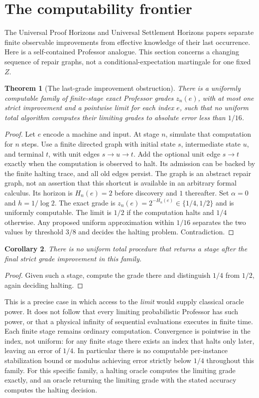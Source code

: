 \documentclass[11pt,letterpaper]{article}
\newtheorem{theorem}{Theorem}[section]
\newtheorem{corollary}[theorem]{Corollary}
\theoremstyle{definition}\newtheorem{definition}[theorem]{Definition}\newtheorem{example}[theorem]{Example}\newtheorem{conjecture}[theorem]{Conjecture}
\begin{document}
\section{The computability frontier}\label{sec:computability}
The Universal Proof Horizons and Universal Settlement Horizons papers \cite{uph,ush} separate finite observable improvements from effective knowledge of their last occurrence. Here is a self-contained Professor analogue. This section concerns a changing sequence of repair graphs, not a conditional-expectation martingale for one fixed $Z$.
\begin{theorem}[The last-grade improvement obstruction]\label{thm:halting}
There is a uniformly computable family of finite-stage exact Professor grades $z_n(e)$, with at most one strict improvement and a pointwise limit for each index $e$, such that no uniform total algorithm computes their limiting grades to absolute error less than $1/16$.
\end{theorem}
\begin{proof}
Let $e$ encode a machine and input. At stage $n$, simulate that computation for $n$ steps. Use a finite directed graph with initial state $s$, intermediate state $u$, and terminal $t$, with unit edges $s\to u\to t$. Add the optional unit edge $s\to t$ exactly when the computation is observed to halt. Its admission can be backed by the finite halting trace, and all old edges persist. The graph is an abstract repair graph, not an assertion that this shortcut is available in an arbitrary formal calculus. Its horizon is $H_n(e)=2$ before discovery and $1$ thereafter. Set $\alpha=0$ and $h=1/\log2$. The exact grade is $z_n(e)=2^{-H_n(e)}\in\{1/4,1/2\}$ and is uniformly computable. The limit is $1/2$ if the computation halts and $1/4$ otherwise. Any proposed uniform approximation within $1/16$ separates the two values by threshold $3/8$ and decides the halting problem. Contradiction.
\end{proof}
\begin{corollary}
There is no uniform total procedure that returns a stage after the final strict grade improvement in this family.
\end{corollary}
\begin{proof}Given such a stage, compute the grade there and distinguish $1/4$ from $1/2$, again deciding halting.\end{proof}
This is a precise case in which access to the \emph{limit} would supply classical oracle power. It does not follow that every limiting probabilistic Professor has such power, or that a physical infinity of sequential evaluations executes in finite time. Each finite stage remains ordinary computation. Convergence is pointwise in the index, not uniform: for any finite stage there exists an index that halts only later, leaving an error of $1/4$. In particular there is no computable per-instance stabilization bound or modulus achieving error strictly below $1/4$ throughout this family. For this specific family, a halting oracle computes the limiting grade exactly, and an oracle returning the limiting grade with the stated accuracy computes the halting decision.
\end{document}
